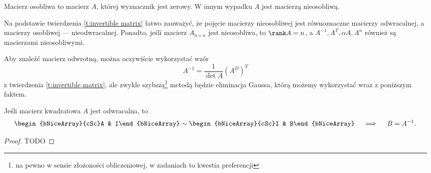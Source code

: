 \begin{definition}
    Macierz osobliwa to macierz $A$, której wyznacznik jest zerowy. W innym wypadku $A$ jest macierzą nieosobliwą.
\end{definition}

Na podstawie twierdzenia \ref{t:invertible matrix} łatwo zauważyć, że pojęcie macierzy nieosobliwej jest równoznaczne macierzy odwracalnej, a macierzy osobliwej --- nieodwracalnej. Ponadto, jeśli macierz $A_{n\times n}$ jest nieosobliwa, to $\rank A = n$, a $A^{-1}, A^T, \alpha A, A^n$ również są macierzami nieosobliwymi.

Aby znaleźć macierz odwrotną, można oczywiście wykorzystać wzór
\[ A^{-1} = \frac{1}{\det A}(A^D)^T \]
z twierdzenia \ref{t:invertible matrix}, ale zwykle szybszą\footnote{na pewno w sensie złożoności obliczeniowej, w zadaniach to kwestia preferencji} metodą będzie eliminacja Gaussa, którą możemy wykorzystać wraz z poniższym faktem.

\begin{fact}
    Jeśli macierz kwadratowa $A$ jest odwracalna, to
    \[ \begin{bNiceArray}{cSc}A & I\end{bNiceArray} \sim \begin{bNiceArray}{cSc}I & B\end{bNiceArray} \quad\implies\quad B = A^{-1}. \]
\end{fact}
\begin{proof}
    TODO
\end{proof}

